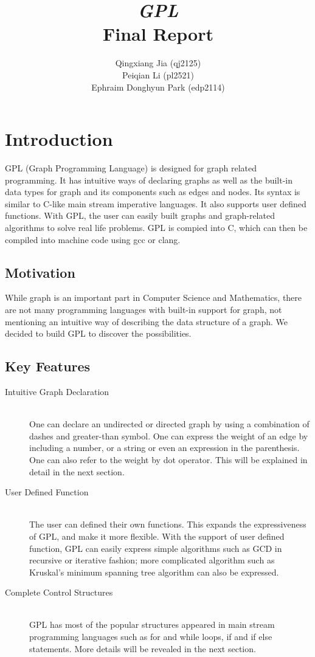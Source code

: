 \documentclass[a4paper,12pt]{article}
\begin{document}
\title{\textit{GPL} \\ Final Report}
\author{Qingxiang Jia (qj2125)\\ Peiqian Li (pl2521)\\ Ephraim Donghyun Park (edp2114)}
\maketitle
\tableofcontents
\newpage

\section{Introduction}
GPL (Graph Programming Language) is designed for graph related programming. It has intuitive ways of declaring graphs as well as the built-in data types for graph and its components such as edges and nodes. Its syntax is similar to C-like main stream imperative languages. It also supports user defined functions. With GPL, the user can easily built graphs and graph-related algorithms to solve real life problems. GPL is compied into C, which can then be compiled into machine code using gcc or clang.

\subsection{Motivation}
While graph is an important part in Computer Science and Mathematics, there are not many programming languages with built-in support for graph, not mentioning an intuitive way of describing the data structure of a graph. We decided to build GPL to discover the possibilities.

\subsection{Key Features}
\begin{description}
	\item[Intuitive Graph Declaration] \hfill \\ 
	One can declare an undirected or directed graph by using a combination of dashes and greater-than symbol. One can express the weight of an edge by including a number, or a string or even an expression in the parenthesis. One can also refer to the weight by dot operator. This will be explained in detail in the next section.
	\item[User Defined Function] \hfill \\
	The user can defined their own functions. This expands the expressiveness of GPL, and make it more flexible. With the support of user defined function, GPL can easily express simple algorithms such as GCD in recursive or iterative fashion; more complicated algorithm such as Kruskal's minimum spanning tree algorithm can also be expressed.
	\item[Complete Control Structures] \hfill \\
	GPL has most of the popular structures appeared in main stream programming languages such as for and while loops, if and if else statements. More details will be revealed in the next section. 
\end{description}
\end{document}
